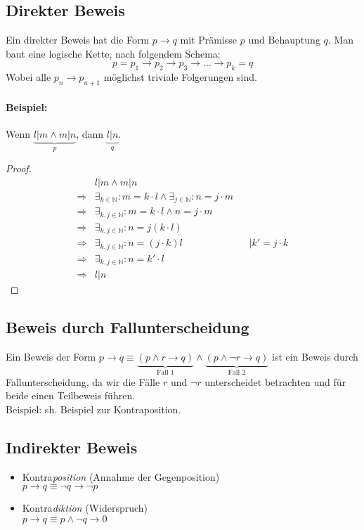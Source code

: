 \subsection{Direkter Beweis}
Ein direkter Beweis hat die Form $p\rightarrow q$ mit Prämisse $p$ und Behauptung $q$. Man baut eine \glqq logische Kette\grqq , nach folgendem Schema:
\[
p=p_1\rightarrow p_2 \rightarrow p_3 \rightarrow \ldots \rightarrow p_k=q
\]
Wobei alle $p_n\rightarrow p_{n+1}$ möglichst triviale Folgerungen sind.

\paragraph{Beispiel:}Wenn $\underbrace{l|m \land m|n}_{p}$, dann $\underbrace{l|n}_{q}$.
\begin{proof}
\begin{align}
&l|m \land m|n \\
\Rightarrow &\exists_{k\in\mathbb{N}}: m=k\cdot l \land \exists_{j\in\mathbb{N}}: n=j\cdot m \\
\Rightarrow &\exists_{k,j\in\mathbb{N}}: m=k\cdot l \land n=j\cdot m \\
\Rightarrow &\exists_{k,j\in\mathbb{N}}: n=j(k\cdot l) \\
\Rightarrow &\exists_{k,j\in\mathbb{N}}: n=(j\cdot k)l && \mid k'=j\cdot k \\
\Rightarrow &\exists_{k,j\in\mathbb{N}}: n=k' \cdot l \\
\Rightarrow &l|n
\end{align}
\end{proof}

\subsection{Beweis durch Fallunterscheidung}
Ein Beweis der Form $p\rightarrow q \equiv \underbrace{(p\land r\rightarrow q)}_\text{Fall 1} \land \underbrace{(p\land\neg r \rightarrow q)}_\text{Fall 2}$ ist ein Beweis durch Fallunterscheidung, da wir die Fälle $r$ und $\neg r$ unterscheidet betrachten und für beide einen Teilbeweis führen.\\
Beispiel: sh. Beispiel zur Kontraposition.
\subsection{Indirekter Beweis}
\begin{itemize}
\item Kontra\emph{position} (Annahme der Gegenposition) \\
$p\rightarrow q \equiv \neg q \rightarrow\neg p$
\item Kontra\emph{diktion} (Widerspruch) \\
$p\rightarrow q \equiv p \land\neg q \rightarrow 0$
\end{itemize}


